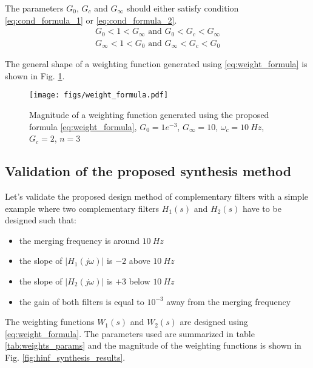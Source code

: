 \documentclass[letterpaper, 10 pt, conference]{ieeeconf}
\begin{document}
The parameters \(G_0\), \(G_c\) and \(G_\infty\) should either satisfy condition \eqref{eq:cond_formula_1} or \eqref{eq:cond_formula_2}.
\begin{subequations}
\label{eq:condition_params_formula}
  \begin{align}
    G_0 < 1 < G_\infty \text{ and } G_0 < G_c < G_\infty \label{eq:cond_formula_1}\\
    G_\infty < 1 < G_0 \text{ and } G_\infty < G_c < G_0 \label{eq:cond_formula_2}
  \end{align}
\end{subequations}

The general shape of a weighting function generated using \eqref{eq:weight_formula} is shown in Fig. \ref{fig:weight_formula}.

\begin{figure}[htbp]
\centering
\texttt{[image: figs/weight\_formula.pdf]}
\caption{\label{fig:weight_formula}
Magnitude of a weighting function generated using the proposed formula \eqref{eq:weight_formula}, \(G_0 = 1e^{-3}\), \(G_\infty = 10\), \(\omega_c = \SI{10}{Hz}\), \(G_c = 2\), \(n = 3\)}
\end{figure}

\subsection{Validation of the proposed synthesis method}
\label{sec:org32ec287}
\label{sec:hinf_example}
Let's validate the proposed design method of complementary filters with a simple example where two complementary filters \(H_1(s)\) and \(H_2(s)\) have to be designed such that:
\begin{itemize}
\item the merging frequency is around \(\SI{10}{Hz}\)
\item the slope of \(|H_1(j\omega)|\) is \(-2\) above \(\SI{10}{Hz}\)
\item the slope of \(|H_2(j\omega)|\) is \(+3\) below \(\SI{10}{Hz}\)
\item the gain of both filters is equal to \(10^{-3}\) away from the merging frequency
\end{itemize}

The weighting functions \(W_1(s)\) and \(W_2(s)\) are designed using \eqref{eq:weight_formula}.
The parameters used are summarized in table \ref{tab:weights_params} and the magnitude of the weighting functions is shown in Fig. \ref{fig:hinf_synthesis_results}.
\end{document}
